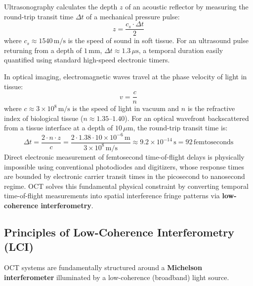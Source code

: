\documentclass[11pt,a4paper]{article}
\begin{document}
Ultrasonography calculates the depth $z$ of an acoustic reflector by measuring the round-trip transit time $\Delta t$ of a mechanical pressure pulse:
\begin{equation}
    z = \frac{c_s \cdot \Delta t}{2}
\end{equation}
where $c_s \approx 1540\,\text{m/s}$ is the speed of sound in soft tissue. For an ultrasound pulse returning from a depth of $1\,\text{mm}$, $\Delta t \approx 1.3\,\mu\text{s}$, a temporal duration easily quantified using standard high-speed electronic timers.

In optical imaging, electromagnetic waves travel at the phase velocity of light in tissue:
\begin{equation}
    v = \frac{c}{n}
\end{equation}
where $c \approx 3 \times 10^8\,\text{m/s}$ is the speed of light in vacuum and $n$ is the refractive index of biological tissue ($n \approx 1.35\text{--}1.40$). For an optical wavefront backscattered from a tissue interface at a depth of $10\,\mu\text{m}$, the round-trip transit time is:
\begin{equation}
    \Delta t = \frac{2 \cdot n \cdot z}{c} = \frac{2 \cdot 1.38 \cdot 10 \times 10^{-6}\,\text{m}}{3 \times 10^8\,\text{m/s}} \approx 9.2 \times 10^{-14}\,\text{s} = 92\,\text{femtoseconds}
\end{equation}
Direct electronic measurement of femtosecond time-of-flight delays is physically impossible using conventional photodiodes and digitizers, whose response times are bounded by electronic carrier transit times in the picosecond to nanosecond regime. OCT solves this fundamental physical constraint by converting temporal time-of-flight measurements into spatial interference fringe patterns via \textbf{low-coherence interferometry}.

\subsection{Principles of Low-Coherence Interferometry (LCI)}

OCT systems are fundamentally structured around a \textbf{Michelson interferometer} illuminated by a low-coherence (broadband) light source.
\end{document}
